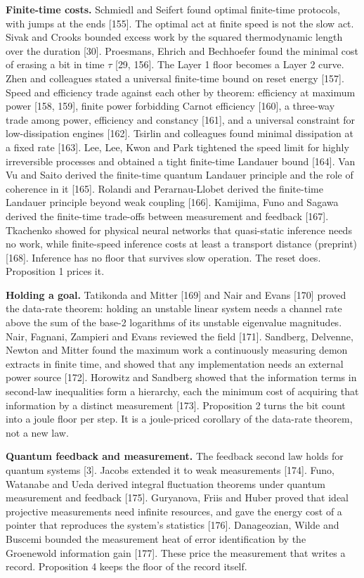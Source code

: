 \documentclass[
  10pt,
]{article}
\begin{document}
\textbf{Finite-time costs.} Schmiedl and Seifert found optimal
finite-time protocols, with jumps at the ends {[}155{]}. The optimal act
at finite speed is not the slow act. Sivak and Crooks bounded excess
work by the squared thermodynamic length over the duration {[}30{]}.
Proesmans, Ehrich and Bechhoefer found the minimal cost of erasing a bit
in time \(\tau\) {[}29, 156{]}. The Layer 1 floor becomes a Layer 2
curve. Zhen and colleagues stated a universal finite-time bound on reset
energy {[}157{]}. Speed and efficiency trade against each other by
theorem: efficiency at maximum power {[}158, 159{]}, finite power
forbidding Carnot efficiency {[}160{]}, a three-way trade among power,
efficiency and constancy {[}161{]}, and a universal constraint for
low-dissipation engines {[}162{]}. Tsirlin and colleagues found minimal
dissipation at a fixed rate {[}163{]}. Lee, Lee, Kwon and Park tightened
the speed limit for highly irreversible processes and obtained a tight
finite-time Landauer bound {[}164{]}. Van Vu and Saito derived the
finite-time quantum Landauer principle and the role of coherence in it
{[}165{]}. Rolandi and Perarnau-Llobet derived the finite-time Landauer
principle beyond weak coupling {[}166{]}. Kamijima, Funo and Sagawa
derived the finite-time trade-offs between measurement and feedback
{[}167{]}. Tkachenko showed for physical neural networks that
quasi-static inference needs no work, while finite-speed inference costs
at least a transport distance (preprint) {[}168{]}. Inference has no
floor that survives slow operation. The reset does. Proposition 1 prices
it.

\textbf{Holding a goal.} Tatikonda and Mitter {[}169{]} and Nair and
Evans {[}170{]} proved the data-rate theorem: holding an unstable linear
system needs a channel rate above the sum of the base-2 logarithms of
its unstable eigenvalue magnitudes. Nair, Fagnani, Zampieri and Evans
reviewed the field {[}171{]}. Sandberg, Delvenne, Newton and Mitter
found the maximum work a continuously measuring demon extracts in finite
time, and showed that any implementation needs an external power source
{[}172{]}. Horowitz and Sandberg showed that the information terms in
second-law inequalities form a hierarchy, each the minimum cost of
acquiring that information by a distinct measurement {[}173{]}.
Proposition 2 turns the bit count into a joule floor per step. It is a
joule-priced corollary of the data-rate theorem, not a new law.

\textbf{Quantum feedback and measurement.} The feedback second law holds
for quantum systems {[}3{]}. Jacobs extended it to weak measurements
{[}174{]}. Funo, Watanabe and Ueda derived integral fluctuation theorems
under quantum measurement and feedback {[}175{]}. Guryanova, Friis and
Huber proved that ideal projective measurements need infinite resources,
and gave the energy cost of a pointer that reproduces the system's
statistics {[}176{]}. Danageozian, Wilde and Buscemi bounded the
measurement heat of error identification by the Groenewold information
gain {[}177{]}. These price the measurement that writes a record.
Proposition 4 keeps the floor of the record itself.
\end{document}
